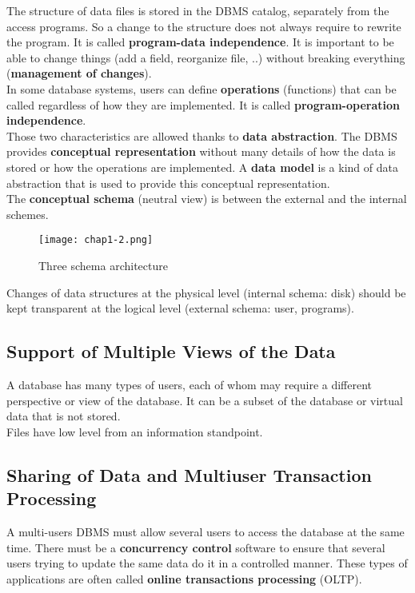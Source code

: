 The structure of data files is stored in the DBMS catalog, separately from the access programs. So a change to the structure does not always require to rewrite the program. It is called \textbf{program-data independence}. It is important to be able to change things (add a field, reorganize file, ..) without breaking everything (\textbf{management of changes}).\\

In some database systems, users can define \textbf{operations} (functions) that can be called regardless of how they are implemented. It is called \textbf{program-operation independence}.\\

Those two characteristics are allowed thanks to \textbf{data abstraction}. The DBMS provides \textbf{conceptual representation} without many details of how the data is stored or how the operations are implemented. A \textbf{data model} is a kind of data abstraction that is used to provide this conceptual representation.\\

The \textbf{conceptual schema} (neutral view) is between the external and the internal schemes.

\begin{figure}[!h]
    \centering
    \texttt{[image: chap1-2.png]}
    \caption{Three schema architecture}
    \label{fig:architecture-1}
\end{figure}

Changes of data structures at the physical level (internal schema: disk) should be kept transparent at the logical level (external schema: user, programs).

\subsection{Support of Multiple Views of the Data}
A database has many types of users, each of whom may require a different perspective or view of the database. It can be a subset of the database or virtual data that is not stored.\\

Files have low level from an information standpoint.

\subsection{Sharing of Data and Multiuser Transaction Processing}

A multi-users DBMS must allow several users to access the database at the same time. There must be a \textbf{concurrency control} software to ensure that several users trying to update the same data do it in a controlled manner. These types of applications are often called \textbf{online transactions processing} (OLTP).\\

